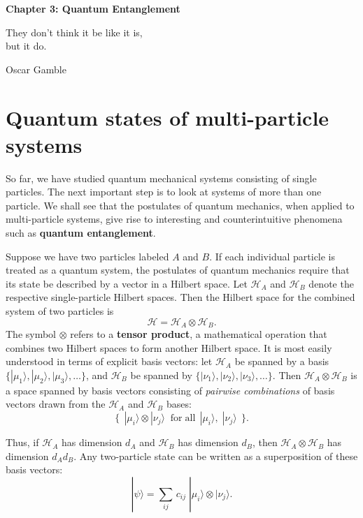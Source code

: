\documentclass[pra,12pt]{revtex4}
\begin{document}
\setcounter{page}{37}

\begin{center}
{\Large \textbf{Chapter 3: Quantum Entanglement}}
\end{center}

\epigraph{They don't think it be like it is, \\but it do.}{Oscar Gamble}

\section{Quantum states of multi-particle systems}
\label{sec:tensorprod}

So far, we have studied quantum mechanical systems consisting of
single particles.  The next important step is to look at systems of
more than one particle.  We shall see that the postulates of quantum
mechanics, when applied to multi-particle systems, give rise to
interesting and counterintuitive phenomena such as \textbf{quantum
  entanglement}.

Suppose we have two particles labeled $A$ and $B$.  If each individual
particle is treated as a quantum system, the postulates of quantum
mechanics require that its state be described by a vector in a Hilbert
space.  Let $\mathscr{H}_A$ and $\mathscr{H}_B$ denote the respective
single-particle Hilbert spaces.  Then the Hilbert space for the
combined system of two particles is
\begin{equation}
  \mathscr{H} = \mathscr{H}_A\otimes \mathscr{H}_B.
\end{equation}
The symbol $\otimes$ refers to a \textbf{tensor product}, a
mathematical operation that combines two Hilbert spaces to form
another Hilbert space.  It is most easily understood in terms of
explicit basis vectors: let $\mathscr{H}_A$ be spanned by a basis
$\{|\mu_1\rangle, |\mu_2\rangle, |\mu_3\rangle, \dots\}$, and
$\mathscr{H}_B$ be spanned by $\{|\nu_1\rangle, |\nu_2\rangle,
|\nu_3\rangle, \dots\}$.  Then $\mathscr{H}_A \otimes \mathscr{H}_B$
is a space spanned by basis vectors consisting of \textit{pairwise
  combinations} of basis vectors drawn from the $\mathscr{H}_A$ and
$\mathscr{H}_B$ bases:
\begin{equation}
  \Big\{\;\,|\mu_i\rangle\otimes|\nu_j\rangle \;\;  \textrm{for} \; \textrm{all}\;\,|\mu_i\rangle,\; |\nu_j\rangle \;\,\Big\}.
\end{equation}

Thus, if $\mathscr{H}_A$ has dimension $d_A$ and $\mathscr{H}_B$ has
dimension $d_B$, then $\mathscr{H}_A\otimes \mathscr{H}_B$ has
dimension $d_A d_B$.  Any two-particle state can be written as a
superposition of these basis vectors:
\begin{equation}
  |\psi\rangle = \sum_{ij} \, c_{ij}\; |\mu_i\rangle \otimes |\nu_j\rangle.
\end{equation}
\end{document}
